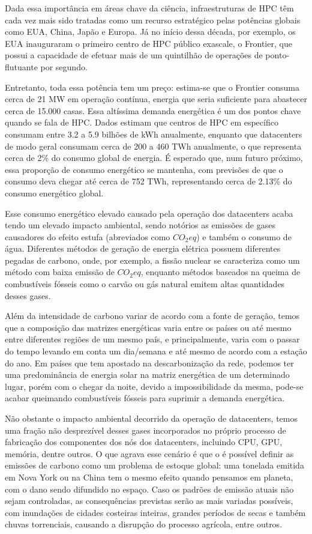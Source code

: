 Dada essa importância em áreas chave da ciência, infraestruturas de HPC têm cada vez mais sido tratadas
como um recurso estratégico pelas potências globais como EUA, China, Japão e Europa. Já no início dessa década, por exemplo,
os EUA inauguraram o primeiro centro de HPC público exascale, o Frontier, que possui a capacidade de efetuar mais de um quintilhão de operações
de ponto-flutuante por segundo. 

Entretanto, toda essa potência tem um preço: estima-se que o Frontier consuma cerca de 21 MW em operação contínua, 
energia que seria suficiente para abastecer cerca de 15.000 casas. Essa altíssima demanda energética é um
dos pontos chave quando se fala de HPC. Dados estimam que centros de HPC em específico consumam entre 3.2 a 5.9 bilhões 
de kWh anualmente, enquanto que datacenters de modo geral consumam cerca de 200 a 460 TWh anualmente, o que 
representa cerca de 2\% do consumo global de energia. É esperado que, num futuro próximo, essa proporção
de consumo energético se mantenha, com previsões de que o consumo deva chegar até cerca de 752 TWh, representando cerca de 2.13\% do consumo energético global. 

Esse consumo energético elevado causado pela operação dos datacenters acaba tendo um elevado
impacto ambiental, sendo notórios as emissões de gases causadores do efeito estufa (abreviados como $CO_{2}eq$) e também
o consumo de água. Diferentes métodos de geração de energia elétrica possuem diferentes pegadas
de carbono, onde, por exemplo, a fissão nuclear se caracteriza como um método com baixa emissão de $CO_{2}eq$, 
enquanto métodos baseados na queima de combustíveis fósseis como o carvão ou gás natural emitem
altas quantidades desses gases. 

Além da intensidade de carbono variar de acordo com a fonte de geração, 
temos que a composição das matrizes energéticas varia entre os países ou até mesmo entre diferentes
regiões de um mesmo país, e principalmente, varia com o passar do tempo levando em conta um dia/semana
e até mesmo de acordo com a estação do ano. Em países que tem apostado na descarbonização da rede,
podemos ter uma predominância de energia solar na matriz energética de um determinado lugar, porém 
com o chegar da noite, devido a impossibilidade da mesma, pode-se acabar queimando combustíveis
fósseis para suprimir a demanda energética.

Não obstante o impacto ambiental decorrido da operação de datacenters, temos uma fração não desprezível desses gases
incorporados no próprio processo de fabricação dos componentes dos nós dos datacenters, 
incluindo CPU, GPU, memória, dentre outros. O que agrava esse cenário é que o é possível definir
as emissões de carbono como um problema de estoque global: uma tonelada emitida em Nova York ou na China
tem o mesmo efeito quando pensamos em planeta, com o dano sendo difundido no espaço. Caso os padrões de emissão atuais 
não sejam controladas, as consequências previstas serão as mais variadas possíveis, com inundações de
cidades costeiras inteiras, grandes períodos de secas e também chuvas torrenciais, causando a disrupção
do processo agrícola, entre outros.

